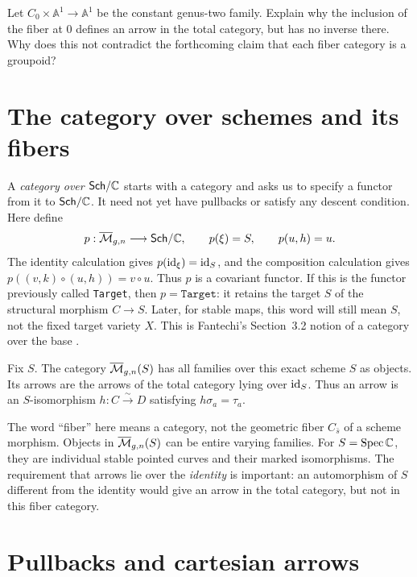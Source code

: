 
\begin{Ej}\label{ex:total-vs-fiber}
Let $C_0\times\mathbb A^1\to\mathbb A^1$ be the constant
genus-two family. Explain why the inclusion of the fiber at $0$
defines an arrow in the total category, but has no inverse there.
Why does this not contradict the forthcoming claim that each fiber
category is a groupoid?
\end{Ej}

\section{The category over schemes and its fibers}

A \emph{category over $\mathsf{Sch}/\mathbb C$} starts with a category and asks
us to specify a functor from it to $\mathsf{Sch}/\mathbb C$. It need not yet have
pullbacks or satisfy any descent condition. Here define
\[
p:\overline{\mathcal M}_{g,n}\longrightarrow\mathsf{Sch}/\mathbb C,\qquad
p(\xi)=S,\qquad p(u,h)=u.
\]
The identity calculation gives $p(\operatorname{id}_\xi)=\operatorname{id}_S$, and the
composition calculation gives $p((v,k)\circ(u,h))=v\circ u$.
Thus $p$ is a covariant functor. If this is the functor previously
called \texttt{Target}, then $p=\texttt{Target}$: it retains the
target $S$ of the structural morphism $C\to S$. Later, for stable
maps, this word will still mean $S$, not the fixed target variety $X$.
This is Fantechi's Section~3.2 notion of a category over the base
\cite{Fantechi}.

\begin{Def}\label{def:curve-fiber}
Fix $S$. The category $\overline{\mathcal M}_{g,n}(S)$ has all families over this exact
scheme $S$ as objects. Its arrows are the arrows of the total
category lying over $\operatorname{id}_S$. Thus an arrow is an $S$-isomorphism
$h:C\xrightarrow{\sim}D$ satisfying $h\sigma_a=\tau_a$.
\end{Def}

The word ``fiber'' here means a category, not the geometric fiber
$C_{\bar s}$ of a scheme morphism. Objects in $\overline{\mathcal M}_{g,n}(S)$ can be
entire varying families. For $S=\operatorname{Spec}\mathbb C$, they are individual
stable pointed curves and their marked isomorphisms. The requirement
that arrows lie over the \emph{identity} is important: an automorphism
of $S$ different from the identity would give an arrow in the total
category, but not in this fiber category.

\section{Pullbacks and cartesian arrows}\label{sec:curve-pullback}

